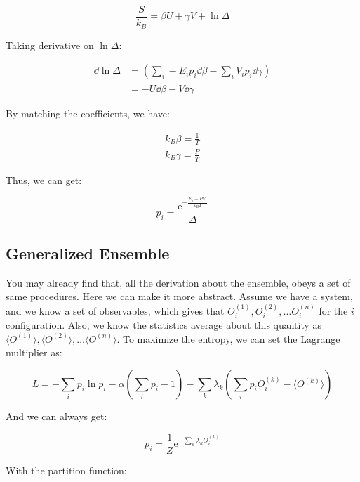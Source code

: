\documentclass[../main.tex]{subfiles}
\begin{document}
\begin{equation}
    \frac{S}{k_B} = \beta U + \gamma \bar{V} + \ln \Delta
\end{equation}

Taking derivative on $\ln \Delta$:

\begin{align}
    \dd{\ln \Delta} &= (\sum_{i}-E_i p_i \dd{\beta} - \sum_{i}V_i p_i \dd{\gamma})\nonumber\\
    &= -U\dd{\beta} - \bar{V}\dd{\gamma}
\end{align}

By matching the coefficients, we have:

\begin{align}
    k_B \beta = \frac{1}{T}\\
    k_B \gamma = \frac{P}{T}
\end{align}

Thus, we can get:

\begin{equation}
    p_i = \frac{\textrm{e}^{-\frac{E_i + PV_i}{k_B T}}}{\Delta}
\end{equation}

\subsection{Generalized Ensemble}

You may already find that, all the derivation about the ensemble, obeys a set of same procedures. Here we can make it more abstract. Assume we have a system, and we know a set of observables, which gives that $O_i^{(1)}, O_i^{(2)}, \dots O_i^{(n)}$ for the $i$ configuration. Also, we know the statistics average about this quantity as $\langle O^{(1)} \rangle, \langle O^{(2)} \rangle, \dots \langle O^{(n)} \rangle$. To maximize the entropy, we can set the Lagrange multiplier as:

\begin{equation}
    L = -\sum_{i} p_i \ln p_i - \alpha (\sum_{i} p_i - 1) - \sum_{k} \lambda_k (\sum_{i} p_i O_i^{(k)} - \langle O^{(k)} \rangle)
\end{equation}

And we can always get:

\begin{equation}
    p_i = \frac{1}{Z} \textrm{e}^{-\sum_{k} \lambda_k O^{(k)}_i}
\end{equation}

With the partition function:
\end{document}
